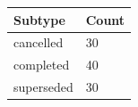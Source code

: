 \begin{tabular}{ll}
\hline
Subtype & Count \\
\hline
cancelled & 30 \\
completed & 40 \\
superseded & 30 \\
\hline
\end{tabular}
